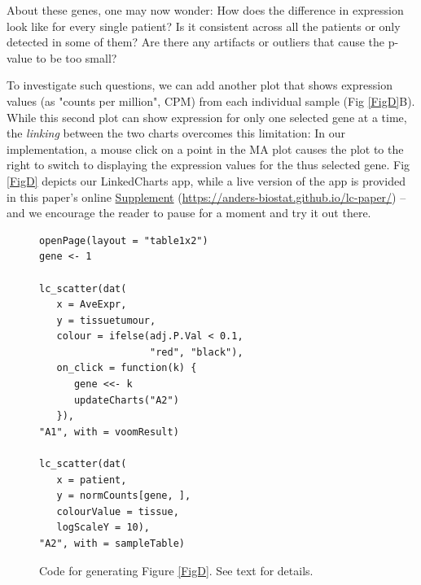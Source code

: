 \documentclass[twocolumn,10pt]{article}
\newcommand{\Supplement}{\href{https://anders-biostat.github.io/lc-paper/}{Supplement}}
\begin{document}
About these genes, one may now wonder: How does the difference in expression look like for every single patient? Is it consistent across all the patients or only detected in some of them? Are there any artifacts or outliers that cause the p-value to be too small?

To investigate such questions, we can add another plot that shows expression values (as "counts per million", CPM) from each individual sample (Fig \ref{FigD}B). While this second plot can show expression for only one selected gene at a time, the \emph{linking} between the two charts overcomes this limitation: In our implementation, a mouse click on a point in the MA plot causes the plot to the right to switch to displaying the expression values for the thus selected gene. Fig \ref{FigD} depicts our LinkedCharts app, while a live version of the app is provided in this paper's online \Supplement{}  (\url{https://anders-biostat.github.io/lc-paper/}) -- and we encourage the reader to pause for a moment and try it out there. 

\begin{figure}[bh!]
\begin{minipage}{\columnwidth}
\begin{verbatim}
openPage(layout = "table1x2")
gene <- 1

lc_scatter(dat(
   x = AveExpr,
   y = tissuetumour,
   colour = ifelse(adj.P.Val < 0.1, 
                   "red", "black"),
   on_click = function(k) {
      gene <<- k
      updateCharts("A2")
   }),
"A1", with = voomResult)

lc_scatter(dat(
   x = patient,
   y = normCounts[gene, ],
   colourValue = tissue, 
   logScaleY = 10),
"A2", with = sampleTable)
\end{verbatim}
\end{minipage}
\caption{Code for generating Figure \ref{FigD}. See text for details.}
\label{listing}
\end{figure}
\end{document}
